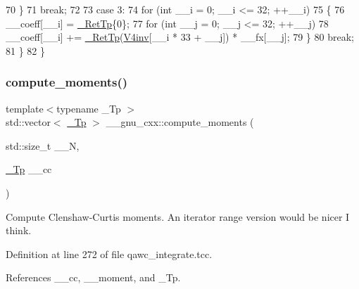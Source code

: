 \begin{DoxyCode}
70             \}
71           \textcolor{keywordflow}{break};
72 
73         \textcolor{keywordflow}{case} 3:
74           \textcolor{keywordflow}{for} (\textcolor{keywordtype}{int} \_\_i = 0; \_\_i <= 32; ++\_\_i)
75             \{
76               \_\_coeff[\_\_i] = \hyperlink{namespace____gnu__cxx_a886e03ece3d53ff7fa6c098a40f93fa5}{\_RetTp}\{0\};
77               \textcolor{keywordflow}{for} (\textcolor{keywordtype}{int} \_\_j = 0; \_\_j <= 32; ++\_\_j)
78                 \_\_coeff[\_\_i] +=  \hyperlink{namespace____gnu__cxx_a886e03ece3d53ff7fa6c098a40f93fa5}{\_RetTp}(\hyperlink{namespace____gnu__cxx_a19b55e8c50f41d9d0a5618653f960f5c}{V4inv}[\_\_i * 33 + \_\_j]) * \_\_fx[\_\_j];
79             \}
80           \textcolor{keywordflow}{break};
81         \}
82     \}
\end{DoxyCode}
\mbox{\label{namespace____gnu__cxx_a698ae16aa1c82aa755f3703cc20e2b8e}} 
\subsubsection{\texorpdfstring{compute\+\_\+moments()}{compute\_moments()}}
{\footnotesize\ttfamily template$<$typename \+\_\+\+Tp $>$ \\
std\+::vector$<$ \hyperlink{namespace____gnu__cxx_a3b19a9c800ca194374ef9172290f7d79}{\+\_\+\+Tp} $>$ \+\_\+\+\_\+gnu\+\_\+cxx\+::compute\+\_\+moments (\begin{DoxyParamCaption}\item[{std\+::size\+\_\+t}]{\+\_\+\+\_\+N,  }\item[{\hyperlink{namespace____gnu__cxx_a3b19a9c800ca194374ef9172290f7d79}{\+\_\+\+Tp}}]{\+\_\+\+\_\+cc }\end{DoxyParamCaption})}

Compute Clenshaw-\/\+Curtis moments. An iterator range version would be nicer I think. 

Definition at line 272 of file qawc\+\_\+integrate.\+tcc.



References \+\_\+\+\_\+cc, \+\_\+\+\_\+moment, and \+\_\+\+Tp.


